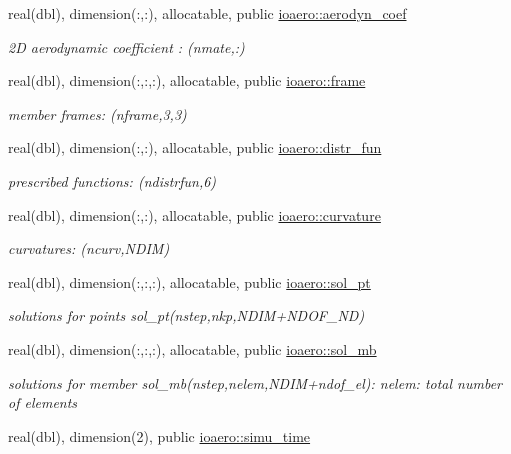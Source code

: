 \begin{DoxyCompactItemize}
real(dbl), dimension(\+:,\+:), allocatable, public \hyperlink{namespaceioaero_a116b30aa43f6d871e7d4a3ed6f4428c3}{ioaero\+::aerodyn\+\_\+coef}
\begin{DoxyCompactList}\small\item\em 2D aerodynamic coefficient \+: (nmate,\+:) \end{DoxyCompactList}\item 
real(dbl), dimension(\+:,\+:,\+:), allocatable, public \hyperlink{namespaceioaero_a26d467b1adbb838f4b1ba3dd4ee1ea0d}{ioaero\+::frame}
\begin{DoxyCompactList}\small\item\em member frames\+: (nframe,3,3) \end{DoxyCompactList}\item 
real(dbl), dimension(\+:,\+:), allocatable, public \hyperlink{namespaceioaero_a1d7c3689e30c2925cd403a84e9176242}{ioaero\+::distr\+\_\+fun}
\begin{DoxyCompactList}\small\item\em prescribed functions\+: (ndistrfun,6) \end{DoxyCompactList}\item 
real(dbl), dimension(\+:,\+:), allocatable, public \hyperlink{namespaceioaero_ab2bc17b64328528015d161cab6490b80}{ioaero\+::curvature}
\begin{DoxyCompactList}\small\item\em curvatures\+: (ncurv,N\+D\+IM) \end{DoxyCompactList}\item 
real(dbl), dimension(\+:,\+:,\+:), allocatable, public \hyperlink{namespaceioaero_af6e62942bb38b7b7d69ea25972fe00bf}{ioaero\+::sol\+\_\+pt}
\begin{DoxyCompactList}\small\item\em solutions for points sol\+\_\+pt(nstep,nkp,N\+D\+I\+M+\+N\+D\+O\+F\+\_\+\+ND) \end{DoxyCompactList}\item 
real(dbl), dimension(\+:,\+:,\+:), allocatable, public \hyperlink{namespaceioaero_a4933d28025772ee22892dc12780a8eef}{ioaero\+::sol\+\_\+mb}
\begin{DoxyCompactList}\small\item\em solutions for member sol\+\_\+mb(nstep,nelem,N\+D\+I\+M+ndof\+\_\+el)\+: nelem\+: total number of elements \end{DoxyCompactList}\item 
real(dbl), dimension(2), public \hyperlink{namespaceioaero_ab6c271c9ebbeb9a315ec53d38facb60b}{ioaero\+::simu\+\_\+time}

\end{DoxyCompactItemize}
